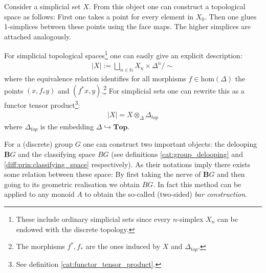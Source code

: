     \begin{example}
        Consider a simplicial set $X$. From this object one can construct a topological space as follows: First one takes a point for every element in $X_0$. Then one glues 1-simplices between these points using the face maps. The higher simplices are attached analogously.

        For simplicial topological spaces\footnote{These include ordinary simplicial sets since every $n$-simplex $X_n$ can be endowed with the discrete topology.} one can easily give an explicit description:
        \begin{gather}
            |X| := \bigsqcup_{n\in\mathbb{N}}X_n\times\Delta^n / \sim
        \end{gather}
        where the equivalence relation identifies for all morphisms $f\in\text{hom}(\Delta)$ the points $(x, f_*y)$ and $(f^*x, y)$.\footnote{The morphisms $f^*, f_*$ are the ones induced by $X$ and $\Delta_{top}$.} For simplicial sets one can rewrite this as a functor tensor product\footnote{See definition \ref{cat:functor_tensor_product}.}:
        \begin{gather}
            |X| = X\otimes_{\Delta}\Delta_{top}
        \end{gather}
        where $\Delta_{top}$ is the embedding $\Delta\hookrightarrow\mathbf{Top}$.
    \end{example}

    \begin{property}
        For a (discrete) group $G$ one can construct two important objects: the delooping $\mathbf{B}G$ and the classifying space $BG$ (see definitions \ref{cat:group_delooping} and \ref{diff:prin:classifying_space} respectively). As their notations imply there exists some relation between these space: By first taking the nerve of $\mathbf{B}G$ and then going to its geometric realisation we obtain $BG$. In fact this method can be applied to any monoid $A$ to obtain the so-called (two-sided) \textit{bar construction}.
    \end{property}


